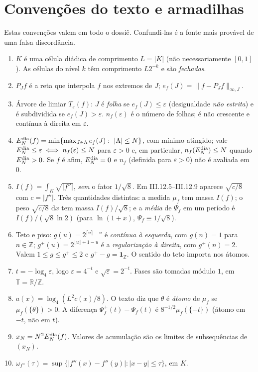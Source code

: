 \documentclass[11pt,a4paper]{article}
\newcommand{\dd}{\,\mathrm d}
\newcommand{\ef}{e_f}
\newcommand{\Edia}{E_N^{\rm dia}}
\begin{document}
\section{Convenções do texto e armadilhas}
Estas convenções valem em todo o dossiê. Confundi-las é a fonte mais provável de uma falsa discordância.
\begin{enumerate}[label=\textbf{C\arabic*.},leftmargin=2.4em]
\item $K$ é uma célula diádica de comprimento $L=|K|$ (não necessariamente $[0,1]$). As células do nível $k$ têm comprimento $L2^{-k}$ e são \emph{fechadas}.
\item $P_Jf$ é a reta que interpola $f$ nos extremos de $J$; $\ef(J)=\|f-P_Jf\|_{\infty,J}$.
\item Árvore de limiar $T_\varepsilon(f)$: $J$ é \emph{folha} se $\ef(J)\le\varepsilon$ (desigualdade \emph{não estrita}) e é subdividida se $\ef(J)>\varepsilon$. $n_f(\varepsilon)$ é o número de folhas; é não crescente e contínua à direita em $\varepsilon$.
\item $E_N^{\rm dia}(f)=\min\{\max_{J\in\Lambda}\ef(J):\ |\Lambda|\le N\}$, com mínimo atingido; vale $\Edia\le\varepsilon\iff n_f(\varepsilon)\le N$ para $\varepsilon>0$ e, em particular, $n_f(\Edia)\le N$ quando $\Edia>0$. Se $f$ é afim, $\Edia=0$ e $n_f$ (definida para $\varepsilon>0$) não é avaliada em $0$.
\item $I(f)=\int_K\sqrt{|f''|}$, \emph{sem} o fator $1/\sqrt8$. Em III.12.5--III.12.9 aparece $\sqrt{c/8}$ com $c=|f''|$. Três quantidades distintas: a medida $\mu_f$ tem massa $I(f)$; o peso $\sqrt{c/8}\,\dd x$ tem massa $I(f)/\sqrt8$; e a \emph{média} de $\Psi_f$ em um período é $I(f)/(\sqrt8\ln2)$ (para $\ln(1+x)$, $\Psi_f\equiv1/\sqrt8$).
\item Teto e piso: $g(u)=2^{\lceil u\rceil-u}$ é \emph{contínua à esquerda}, com $g(n)=1$ para $n\in\mathbb Z$; $g^+(u)=2^{\lfloor u\rfloor+1-u}$ é a \emph{regularização à direita}, com $g^+(n)=2$. Valem $1\le g\le g^+\le2$ e $g^+-g=\mathbf 1_{\mathbb Z}$. O sentido do teto importa nos átomos.
\item $t=-\log_4\varepsilon$, logo $\varepsilon=4^{-t}$ e $\sqrt\varepsilon=2^{-t}$. Fases são tomadas módulo $1$, em $\mathbb T=\mathbb R/\mathbb Z$.
\item $a(x)=\log_4(L^2c(x)/8)$. O texto diz que $\theta$ é \emph{átomo} de $\mu_f$ se $\mu_f(\{\theta\})>0$. A diferença $\Psi_f^+(t)-\Psi_f(t)$ é $8^{-1/2}\mu_f(\{-t\})$ (átomo em $-t$, não em $t$).
\item $x_N=N^2\Edia(f)$. Valores de acumulação são os limites de subsequências de $(x_N)$.
\item $\omega_{f''}(\tau)=\sup\{|f''(x)-f''(y)|:|x-y|\le\tau\}$, em $K$.
\end{enumerate}
\end{document}
